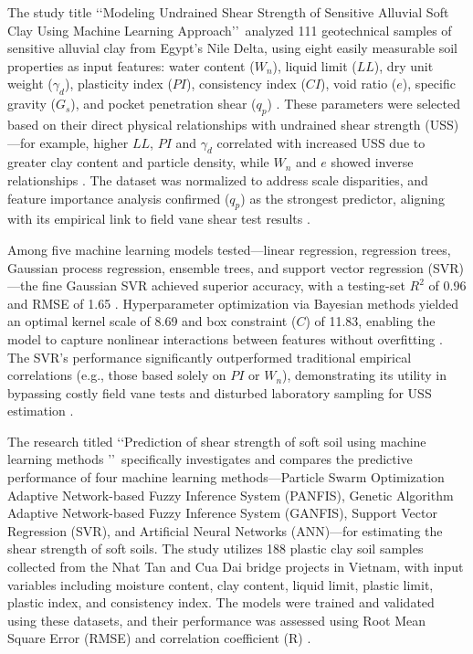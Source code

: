 \documentclass[12pt,a4paper]{article}
\begin{document}
	The study title \lq\lq Modeling Undrained Shear Strength of Sensitive Alluvial Soft Clay Using Machine Learning Approach\rq\rq\ analyzed 111 geotechnical samples of sensitive alluvial clay from Egypt's Nile Delta, using eight easily measurable soil properties as input features: water content ($W_n$), liquid limit ($LL$), dry unit weight ($\gamma_d$), plasticity index ($PI$), consistency index ($CI$), void ratio ($e$), specific gravity ($G_s$), and pocket penetration shear ($q_p$) \cite{app121910177}. These parameters were selected based on their direct physical relationships with undrained shear strength (USS)—for example, higher $LL$, $PI$ and $\gamma_d$ correlated with increased USS due to greater clay content and particle density, while $W_n$ and $e$ showed inverse relationships \cite{app121910177}. The dataset was normalized to address scale disparities, and feature importance analysis confirmed ($q_p$) as the strongest predictor, aligning with its empirical link to field vane shear test results \cite{app121910177}.
	
	Among five machine learning models tested—linear regression, regression trees, Gaussian process regression, ensemble trees, and support vector regression (SVR)—the fine Gaussian SVR achieved superior accuracy, with a testing-set $R^2$ of 0.96 and RMSE of 1.65 \cite{app121910177}. Hyperparameter optimization via Bayesian methods yielded an optimal kernel scale of 8.69 and box constraint ($C$) of 11.83, enabling the model to capture nonlinear interactions between features without overfitting \cite{app121910177}. The SVR’s performance significantly outperformed traditional empirical correlations (e.g., those based solely on $PI$ or $W_n$), demonstrating its utility in bypassing costly field vane tests and disturbed laboratory sampling for USS estimation \cite{app121910177}.
	
	The research titled \lq\lq Prediction of shear strength of soft soil using machine learning methods \rq\rq\ specifically investigates and compares the predictive performance of four machine learning methods—Particle Swarm Optimization Adaptive Network-based Fuzzy Inference System (PANFIS), Genetic Algorithm Adaptive Network-based Fuzzy Inference System (GANFIS), Support Vector Regression (SVR), and Artificial Neural Networks (ANN)—for estimating the shear strength of soft soils. The study utilizes 188 plastic clay soil samples collected from the Nhat Tan and Cua Dai bridge projects in Vietnam, with input variables including moisture content, clay content, liquid limit, plastic limit, plastic index, and consistency index. The models were trained and validated using these datasets, and their performance was assessed using Root Mean Square Error (RMSE) and correlation coefficient (R) \cite{PHAM2018181}.
	
\end{document}
